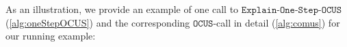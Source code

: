 \documentclass[a4paper,UKenglish,cleveref, autoref, thm-restate, pdfa]{lipics-v2021}
\newcommand\m[1]{\mathcal{#1}}
\renewcommand\comment[1]{}
\newcommand{\emilio}[1]{{\comment{\color{red}Emilio: #1}}}
\newcommand{\bart}[1]{{\comment{\color{OliveGreen}Bart: #1}}}
\newcommand\Iend{\ensuremath{I_\mathit{end} }\xspace}
\newcommand\formularunning{\ensuremath{T_{rex} }\xspace}
\newcommand\mm[1]{\ensuremath{#1}\xspace}
\newcommand\call[1]{\mm{\texttt{#1}}}
\newcommand\comus{\mm{\call{OCUS}}}
\newcommand\onestep{\ensuremath{\call{Explain-One-Step}}\xspace}
\newcommand\onestepo{\ensuremath{\call{Explain-One-Step-OCUS}}\xspace}
\begin{document}
As an illustration, we provide an example of one call to \onestepo (\cref{alg:oneStepOCUS}) and the corresponding \comus-call in detail (\cref{alg:comus}) for our running example:
\end{document}
